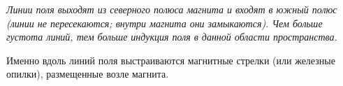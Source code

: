 \documentclass[main.tex]{subfiles}
\begin{document}
\begin{NoHyper}
\emph{Линии поля выходят из северного полюса магнита и входят в южный полюс (линии не пересекаются; внутри магнита они замыкаются). Чем больше густота линий, тем больше индукция поля в данной области пространства.}


Именно вдоль линий поля выстраиваются магнитные стрелки (или железные опилки), размещенные возле магнита. 










\end{NoHyper}
\end{document}

